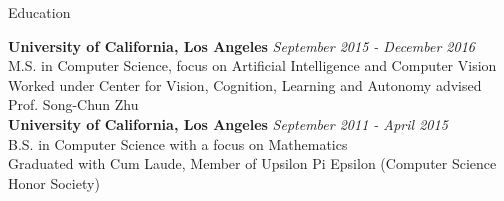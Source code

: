 \documentclass{resume} %
\begin{document}

\begin{rSection}{Education}

{\bf University of California, Los Angeles} \hfill {\em September 2015 - December 2016} \\ 
M.S. in Computer Science, focus on Artificial Intelligence and Computer Vision \\
Worked under Center for Vision, Cognition, Learning and Autonomy advised Prof. Song-Chun Zhu \\
\newline
{\bf University of California, Los Angeles} \hfill {\em September 2011 - April 2015} \\
B.S. in Computer Science with a focus on Mathematics \\
Graduated with Cum Laude, Member of Upsilon Pi Epsilon (Computer Science Honor Society)
\end{rSection}

\end{document}

